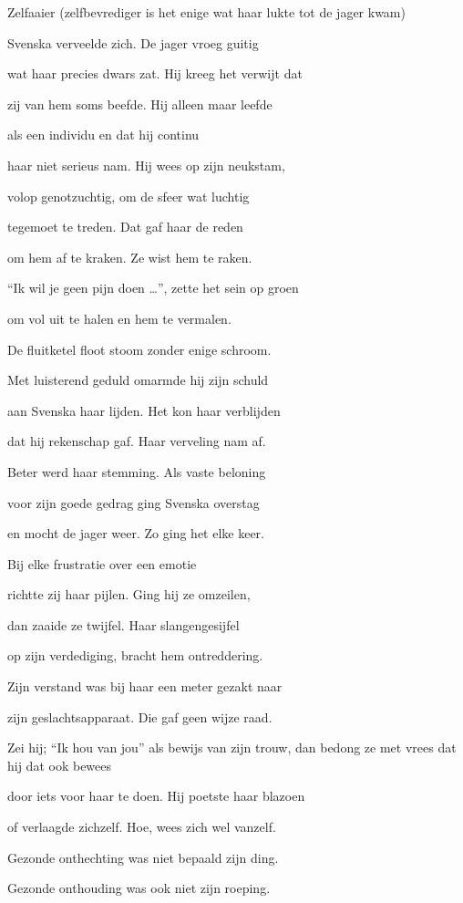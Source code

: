 Zelfaaier (zelfbevrediger is het enige wat haar lukte tot de jager kwam)

Svenska verveelde zich.
De jager vroeg guitig

wat haar precies dwars zat.
Hij kreeg het verwijt dat

zij van hem soms beefde.
Hij alleen maar leefde

als een individu
en dat hij continu

haar niet serieus nam.
Hij wees op zijn neukstam,

volop genotzuchtig,
om de sfeer wat luchtig

tegemoet te treden.
Dat gaf haar de reden

om hem af te kraken.
Ze wist hem te raken.

“Ik wil je geen pijn doen …”,
zette het sein op groen

om vol uit te halen
en hem te vermalen.

De fluitketel floot stoom
zonder enige schroom.

Met luisterend geduld
omarmde hij zijn schuld

aan Svenska haar lijden.
Het kon haar verblijden

dat hij rekenschap gaf.
Haar verveling nam af.

Beter werd haar stemming.
Als vaste beloning

voor zijn goede gedrag
ging Svenska overstag

en mocht de jager weer.
Zo ging het elke keer.

Bij elke frustratie
over een emotie

richtte zij haar pijlen.
Ging hij ze omzeilen,

dan zaaide ze twijfel.
Haar slangengesijfel

op zijn verdediging,
bracht hem ontreddering.

Zijn verstand was bij haar
een meter gezakt naar

zijn geslachtsapparaat.
Die gaf geen wijze raad.

Zei hij; “Ik hou van jou”
als bewijs van zijn trouw,
dan bedong ze met vrees
dat hij dat ook bewees

door iets voor haar te doen.
Hij poetste haar blazoen

of verlaagde zichzelf.
Hoe, wees zich wel vanzelf.

Gezonde onthechting
was niet bepaald zijn ding.

Gezonde onthouding
was ook niet zijn roeping.

